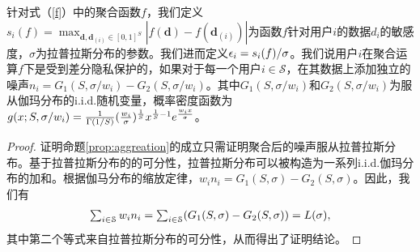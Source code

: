 	\begin{pp}\label{prop:aggreation}
		针对式（\ref{f}）中的聚合函数$f$，我们定义$s_i(f)=\max_{\mathbf{d},\mathbf{d}_{(i)}\in[0,1]^S}|f(\mathbf{d})-f(\mathbf{d}_{(i)})|$为函数$f$针对用户$i$的数据$d_i$的敏感度，$\sigma$为拉普拉斯分布的参数。我们进而定义$\epsilon_i=s_i(f)/\sigma$。我们说用户$i$在聚合运算$f$下是受到差分隐私保护的，如果对于每一个用户$i\in\mathcal{S}$，在其数据上添加独立的噪声$n_i=G_1(S,\sigma/w_i)-G_2(S,\sigma/w_i)$。其中$G_1(S,\sigma/w_i)$和$G_2(S,\sigma/w_i)$为服从伽玛分布的i.i.d.随机变量，概率密度函数为$g(x;S,\sigma/w_i)=\frac{1}{\Gamma(1/S)}\large(\frac{w_i}{\sigma}\large)^{\frac{1}{S}}x^{\frac{1}{S}-1}e^{\frac{w_ix}{\sigma}}$。
	\end{pp}
	
	\begin{proof}
		证明命题\ref{prop:aggreation}的成立只需证明聚合后的噪声服从拉普拉斯分布。基于拉普拉斯分布\cite{kotz2012laplace}的的可分性，拉普拉斯分布可以被构造为一系列i.i.d.伽玛分布的加和。根据伽马分布的缩放定律，$w_in_i=G_1(S,\sigma)-G_2(S,\sigma)$。因此，我们有
		\begin{equation}
		\begin{array}
		[c]{lll}%
		\sum_{i\in\mathcal{S}}w_in_i=\sum_{i\in\mathcal{S}}(G_1(S,\sigma)-G_2(S,\sigma))=L(\sigma),
		\end{array}
		\end{equation}
		其中第二个等式来自拉普拉斯分布\cite{kotz2012laplace}的可分性，从而得出了证明结论。
	\end{proof}

